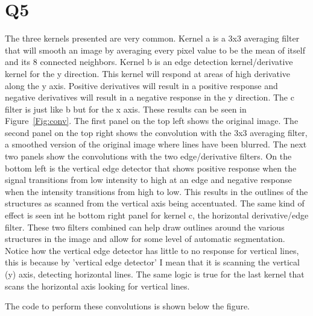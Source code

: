 \documentclass[12pt]{article}
\begin{document}
\section{Q5}

The three kernels presented are very common. Kernel a is a 3x3 averaging filter that will smooth an image by averaging every pixel value to be the mean of itself and its 8 connected neighbors. Kernel b is an edge detection kernel/derivative kernel for the y direction. This kernel will respond at areas of high derivative along the y axis. Positive derivatives will result in a  positive response and negative derivatives will result in a negative response in the y direction. The c filter is just like b but for the x axis. These results can be seen in Figure~\ref{Fig:conv}. The first panel on the top left shows the original image. The second panel on the top right shows the convolution with the 3x3 averaging filter, a smoothed version of the original image where lines have been blurred. The next two panels show the convolutions with the two edge/derivative filters. On the bottom left is the vertical edge detector that shows positive response when the signal transitions from low intensity to high at an edge and negative response when the intensity transitions from high to low. This results in the outlines of the structures as scanned from the vertical axis being accentuated. The same kind of effect is seen int he bottom right panel for kernel c, the horizontal derivative/edge filter. These two filters combined can help draw outlines around the various structures in the image and allow for some level of automatic segmentation. Notice how the vertical edge detector has little to no response for vertical lines, this is because by 'vertical edge detector' I mean that it is scanning the vertical (y) axis, detecting horizontal lines. The same logic is true for the last kernel that scans the horizontal axis looking for vertical lines.

The code to perform these convolutions is shown below the figure.
\end{document}

